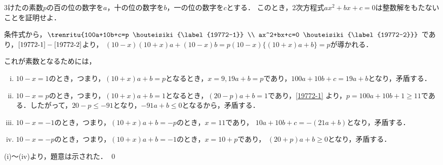 
\begin{problem}
  3けたの素数$p$の百の位の数字を$a$，十の位の数字を$b$，一の位の数字を$c$とする．
このとき，2次方程式$ax^2+bx+c=0$は整数解をもたないことを証明せよ．
\end{problem}

条件式から，$\trenritu{%
  100a+10b+c=p \houteisiki{\label{19772-1}} \\
  ax^2+bx+c=0 \houteisiki{\label{19772-2}}%
}$
であり，$\eqref{19772-1}-\eqref{19772-2}$より，
$(10-x)(10+x)a + (10-x)b = p$\qquad $(10-x)\{(10+x)a+b\}=p$が導かれる．

これが素数となるためには，
\begin{enumerate}[(i)]
  \item $10-x =1$のとき，つまり，$(10+x)a+b=p$となるとき，$x=9, 19a+b=p$であり，$100a+10b+c=19a+b$となり，矛盾する．
  \item $10-x=p$のとき，つまり，$(10+x)a+b=1$となるとき，$(20-p)a+b=1$であり，\eqref{19772-1} より，$p=100a+10b+1 \geq 11$である．したがって，$20-p \leq -91$となり，$-91a + b \leq 0$となるから，矛盾する．
  \item $10-x=-1$のとき，つまり，$(10+x)a+b=-p$のとき，$x=11$であり，
  $10a+10b+c=-(21a+b)$となり，矛盾する．
  \item $10-x=-p$のとき，つまり，$(10+x)a+b=-1$のとき，$x = 10+p$であり，
  $(20+p)a+b \geq 0$となり，矛盾する．
\end{enumerate}

(i)～(iv)より，題意は示された．
\qed
